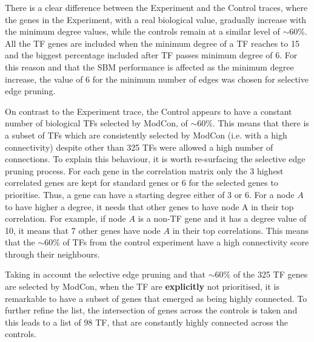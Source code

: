 There is a clear difference between the Experiment and the Control traces, where the genes in the Experiment, with a real biological value, gradually increase with the minimum degree values, while the controls remain at a similar level of $\sim60\%$. All the TF genes are included when the minimum degree of a TF reaches to 15 and the biggest percentage included after TF passes minimum degree of 6. For this reason and that the SBM performance is affected as the minimum degree increase, the value of 6 for the minimum number of edges was chosen for selective edge pruning.


On contrast to the Experiment trace, the Control appears to have a constant number of biological TFs selected by ModCon, of $\sim60\%$. This means that there is a subset of TFs which are consistently selected by ModCon (i.e. with a high connectivity) despite other than 325 TFs were allowed a high number of connections. To explain this behaviour, it is worth re-surfacing the selective edge pruning process. For each gene in the correlation matrix only the 3 highest correlated genes are kept for standard genes or 6 for the selected genes to prioritise. Thus, a gene can have a starting degree either of 3 or 6. For a node $A$ to have higher a degree, it needs that other genes to have node A in their top correlation. For example, if node $A$ is a non-TF gene and it has a degree value of 10, it means that 7 other genes have node $A$ in their top correlations. This means that the  $\sim60\%$ of TFs from the control experiment have a high connectivity score through their neighbours.

Taking in account the selective edge pruning and that $\sim60\%$ of the 325 TF genes are selected by ModCon, when the TF are \textbf{explicitly} not prioritised, it is remarkable to have a subset of genes that emerged as being highly connected. To further refine the list, the intersection of genes across the controls is taken and this leads to a list of 98 TF, that are constantly highly connected across the controls. 

